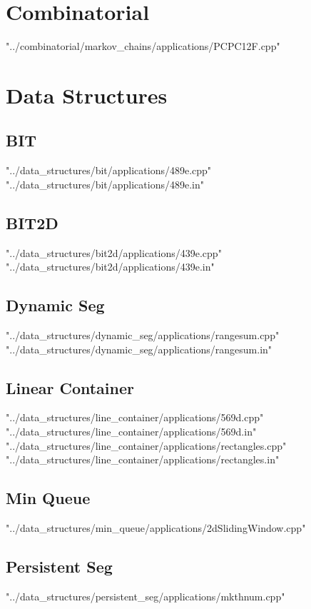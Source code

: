 \documentclass [12pt,onecolumn,oneside]{article}
\begin{document}
\pagestyle{fancy}
\fancyfoot{}
\fancyhead[R]{\thepage}
\renewcommand{\headrulewidth}{0.4pt}
\tableofcontents
\scriptsize

\bigskip
\section{Combinatorial}
 {"../combinatorial/markov_chains/applications/PCPC12F.cpp"}
\section{Data Structures}
\subsection{ BIT}
 {"../data_structures/bit/applications/489e.cpp"}
 {"../data_structures/bit/applications/489e.in"}
\subsection{ BIT2D}
 {"../data_structures/bit2d/applications/439e.cpp"}
 {"../data_structures/bit2d/applications/439e.in"}
\subsection{ Dynamic Seg}
 {"../data_structures/dynamic_seg/applications/rangesum.cpp"}
 {"../data_structures/dynamic_seg/applications/rangesum.in"}
\subsection{ Linear Container}
 {"../data_structures/line_container/applications/569d.cpp"}
 {"../data_structures/line_container/applications/569d.in"}
 {"../data_structures/line_container/applications/rectangles.cpp"}
 {"../data_structures/line_container/applications/rectangles.in"}
\subsection{ Min Queue}
 {"../data_structures/min_queue/applications/2dSlidingWindow.cpp"}
\subsection{ Persistent Seg}
 {"../data_structures/persistent_seg/applications/mkthnum.cpp"}
\end{document}
